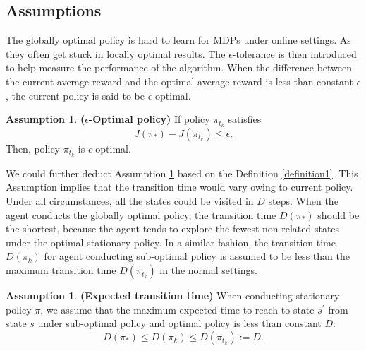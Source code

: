 \documentclass{article}
\theoremstyle{plain}
\theoremstyle{definition}
\newtheorem{assumption}[theorem]{Assumption}
\theoremstyle{remark}
\begin{document}
\subsection{Assumptions}
The globally optimal policy is hard to learn for MDPs under online settings. As they often get stuck in locally optimal results. The $\epsilon$-tolerance is then introduced to help measure the performance of the algorithm. When the difference between the current average reward and the optimal average reward is less than constant $\epsilon$, the current policy is said to be $\epsilon$-optimal.
\begin{assumption}
\label{assumption1}
\textbf{($\epsilon$-Optimal policy)} \citep{hartman1975epsilon} If policy $\pi_{t_{k}}$ satisfies
$$
J(\pi_{*}) - J(\pi_{t_{k}}) \leq \epsilon.
$$
Then, policy $\pi_{t_{k}}$ is $\epsilon$-optimal.
\end{assumption}


We could further deduct Assumption \ref{assumption2} based on the Definition \ref{definition1}. This Assumption implies that the transition time would vary owing to current policy. Under all circumstances, all the states could be visited in $D$ steps. When the agent conducts the globally optimal policy, the transition time $
D(\pi_{*})$ should be the shortest, because the agent tends to explore the fewest non-related states under the optimal stationary policy. In a similar fashion, the transition time $D(\pi_k)$ for agent conducting sub-optimal policy is assumed to be less than the maximum transition time $D(\pi_{t_k})$ in the normal settings.

\begin{assumption}
\label{assumption2}
\textbf{(Expected transition time)} When conducting stationary policy $\pi$, we assume that the maximum expected time to reach to state $s^{\prime}$ from state $s$ under sub-optimal policy and optimal policy is less than constant $D$:
$$
D(\pi_{*}) \leq D(\pi_k) \leq  D(\pi_{t_{k}}) := D.
$$
\end{assumption}
\end{document}
